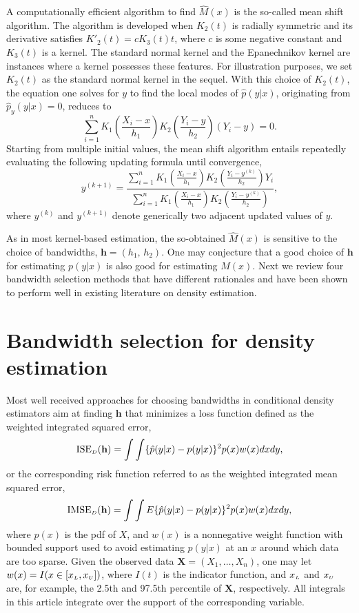 \documentclass[fleqn,12pt,twoside]{article}
\newcommand{\ISE}{\mathrm{ISE}}
\newcommand{\IMSE}{\mathrm{IMSE}}
\newcommand{\bh}{\mathbf{h}}
\newcommand{\bX}{\mathbf{X}}
\numberwithin{equation}{section}
\begin{document}
A computationally efficient algorithm to find $\hat M(x)$ is the so-called mean shift algorithm. The algorithm is developed when $K_2(t)$ is radially symmetric \citep{Comaniciu2002} and its derivative satisfies $K'_2(t)=cK_3(t)t$, where $c$ is some negative constant and $K_3(t)$ is a kernel. The standard normal kernel and the Epanechnikov kernel are instances where a kernel possesses these features. For illustration purposes, we set $K_2(t)$ as the standard normal kernel in the sequel. With this choice of $K_2(t)$, the equation one solves for $y$ to find the local modes of $\hat p(y|x)$, originating from $\hat p_y(y|x)=0$, reduces to 
\begin{equation*}
\sum_{i=1}^n K_1\left(\frac{X_i-x}{h_1}\right)K_2\left(\frac{Y_i-y}{h_2}\right)(Y_i-y)=0.
\end{equation*}
Starting from multiple initial values, the mean shift algorithm entails repeatedly evaluating the following updating formula until convergence, 
\begin{equation}\label{mean-shift}
y^{(k+1)}=\frac{\displaystyle{\sum_{i=1}^n K_1 \left(\frac{X_i-x}{h_1}\right) K_2\left(\frac{Y_i-y^{(k)}}{h_2}\right)Y_i}}{\displaystyle{\sum_{i=1}^n K_1 \left(\frac{X_i-x}{h_1}\right) K_2\left(\frac{Y_i-y^{(k)}}{h_2}\right)}},
\end{equation}
where $y^{(k)}$ and $y^{(k+1)}$ denote generically two adjacent updated values of $y$.

As in most kernel-based estimation, the so-obtained $\hat M(x)$ is sensitive to the choice of bandwidths, $\bh=(h_1,\, h_2)$. One may conjecture that a good choice of $\bh$ for estimating $p(y|x)$ is also good for estimating $M(x)$. Next we review four bandwidth selection methods that have different rationales and have been shown to perform well in existing literature on density estimation. 
 
\section{Bandwidth selection for density estimation}
\label{s:compete}
Most well received approaches for choosing bandwidths in conditional density estimators aim at finding $\bh$ that minimizes a loss function defined as the weighted integrated squared error,
\begin{equation}\label{ISE:d}
\ISE_{\hbox {\tiny $D$}}(\bh) = \int\int \{\hat{p}(y|x)-p(y|x)\}^2p(x) w(x) dxdy, 
\end{equation}
or the corresponding risk function referred to as the weighted integrated mean squared error,
\[ \IMSE_{\hbox {\tiny $D$}}(\bh) = \int\int E\{\hat{p}(y|x)-p(y|x)\}^2p(x) w(x) dxdy, 
\]
where $p(x)$ is the pdf of $X$, and $w(x)$ is a nonnegative weight function with bounded support used to avoid estimating $p(y|x)$ at an $x$ around which data are too sparse. Given the observed data $\bX=(X_1, \ldots, X_n)$, one may let $w(x)=I(x\in [x_{\hbox {\tiny $L$}}, x_{\hbox {\tiny $U$}}])$, where $I(t)$ is the indicator function, and $x_{\hbox {\tiny $L$}}$ and $x_{\hbox {\tiny $U$}}$ are,  for example, the 2.5th and 97.5th percentile of $\bX$, respectively. All integrals in this article integrate over the support of the corresponding variable.
\end{document}
